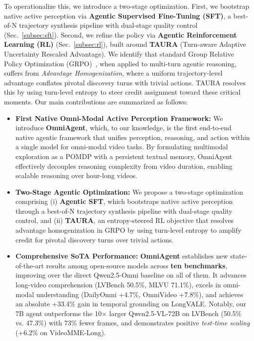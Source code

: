 \documentclass{article}
\theoremstyle{plain}
\theoremstyle{definition}
\theoremstyle{remark}
\newcommand{\model}{OmniAgent\xspace}
\begin{document}
To operationalize this, we introduce a two-stage optimization. First, we
bootstrap native active perception via \textbf{Agentic Supervised Fine-Tuning (SFT)}, a best-of-N trajectory synthesis pipeline with dual-stage quality
control (Sec.~\ref{subsec:sft}). Second, we refine the policy via \textbf{Agentic Reinforcement Learning (RL)} (Sec.~\ref{subsec:rl}), built around \textbf{TAURA}
(Turn-aware Adaptive Uncertainty Rescaled Advantage). We identify that
standard Group Relative Policy Optimization
(GRPO)~\cite{guo2025deepseek}, when applied to multi-turn agentic
reasoning, suffers from \textit{Advantage Homogenization}, where a
uniform trajectory-level advantage conflates pivotal discovery turns
with trivial actions.
TAURA resolves this by using turn-level entropy to steer credit assignment toward these critical moments.
Our main contributions are summarized as follows:
\begin{itemize}

    \item \textbf{First Native Omni-Modal Active Perception Framework:} We
    introduce \textbf{\model}, which, to our knowledge, is the first
    end-to-end native agentic framework that unifies perception, reasoning,
    and action within a single model for omni-modal video tasks. By
    formulating multimodal exploration as a POMDP with a persistent textual
    memory, \model effectively decouples reasoning complexity from video
    duration, enabling scalable reasoning over hour-long videos.

    \item \textbf{Two-Stage Agentic Optimization:} We propose a two-stage
    optimization comprising (i) \textbf{Agentic SFT}, which bootstraps
    native active perception through a best-of-N trajectory synthesis
    pipeline with dual-stage quality control, and (ii) \textbf{TAURA}, an
    entropy-steered RL objective that resolves advantage homogenization
    in GRPO by using turn-level entropy to amplify credit for pivotal
    discovery turns over trivial actions.

    \item \textbf{Comprehensive SoTA Performance:} \textbf{\model} establishes
    new state-of-the-art results among open-source models across \textbf{ten benchmarks}, improving
    over the direct Qwen2.5-Omni baseline on all of them. It advances
    long-video comprehension (LVBench 50.5\%, MLVU 71.1\%), excels in omni-modal
    understanding (DailyOmni +4.7\%, OmniVideo +7.8\%), and achieves an absolute
    +33.4\% gain in temporal grounding on LongVALE. Notably, our 7B agent
    outperforms the 10$\times$ larger Qwen2.5-VL-72B on LVBench (50.5\% vs.
    47.3\%) with 73\% fewer frames, and demonstrates positive
    \textit{test-time scaling} (+6.2\% on VideoMME-Long).

\end{itemize}
\vspace{-2mm}
\end{document}
